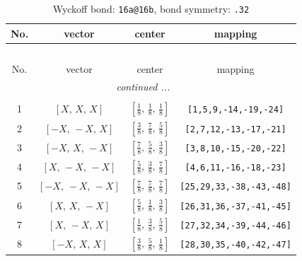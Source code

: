 \documentclass[fleqn,8pt]{jsarticle}
\begin{document}
\begin{longtable}{cccc}
\caption{Wyckoff bond: {\tt 16a@16b}, bond symmetry: {\tt .32}}
 \\
 \hline \hline
No. & vector & center & mapping \\ \hline \endfirsthead

\multicolumn{3}{l}{\tablename\ \thetable{}} \\
 \hline \hline
No. & vector & center & mapping \\ \hline \endhead

 \hline \hline
\multicolumn{3}{r}{\footnotesize\it continued ...} \\ \endfoot

 \hline \hline
\multicolumn{3}{r}{} \\ \endlastfoot

1 & $\left[ X,\, X,\, X \right]$ & $\left[ \frac{1}{8},\, \frac{1}{8},\, \frac{1}{8} \right]$ & {\tt [1,5,9,-14,-19,-24]} \\ \hline
2 & $\left[ - X,\, - X,\, X \right]$ & $\left[ \frac{3}{8},\, \frac{7}{8},\, \frac{5}{8} \right]$ & {\tt [2,7,12,-13,-17,-21]} \\ \hline
3 & $\left[ - X,\, X,\, - X \right]$ & $\left[ \frac{7}{8},\, \frac{5}{8},\, \frac{3}{8} \right]$ & {\tt [3,8,10,-15,-20,-22]} \\ \hline
4 & $\left[ X,\, - X,\, - X \right]$ & $\left[ \frac{5}{8},\, \frac{3}{8},\, \frac{7}{8} \right]$ & {\tt [4,6,11,-16,-18,-23]} \\ \hline
5 & $\left[ - X,\, - X,\, - X \right]$ & $\left[ \frac{7}{8},\, \frac{7}{8},\, \frac{7}{8} \right]$ & {\tt [25,29,33,-38,-43,-48]} \\ \hline
6 & $\left[ X,\, X,\, - X \right]$ & $\left[ \frac{5}{8},\, \frac{1}{8},\, \frac{3}{8} \right]$ & {\tt [26,31,36,-37,-41,-45]} \\ \hline
7 & $\left[ X,\, - X,\, X \right]$ & $\left[ \frac{1}{8},\, \frac{3}{8},\, \frac{5}{8} \right]$ & {\tt [27,32,34,-39,-44,-46]} \\ \hline
8 & $\left[ - X,\, X,\, X \right]$ & $\left[ \frac{3}{8},\, \frac{5}{8},\, \frac{1}{8} \right]$ & {\tt [28,30,35,-40,-42,-47]} \\
\end{longtable}
\renewcommand{\arraystretch}{1.2}
\end{document}
